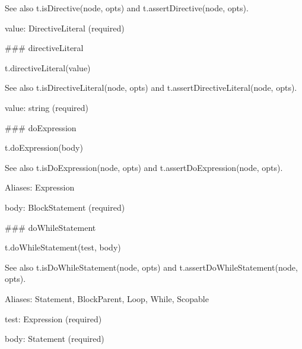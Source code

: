 See also {\ttfamily t.\+is\+Directive(node, opts)} and {\ttfamily t.\+assert\+Directive(node, opts)}.


\begin{DoxyItemize}
\item {\ttfamily value}\+: {\ttfamily Directive\+Literal} (required) 


\end{DoxyItemize}

\#\#\# directive\+Literal 
\begin{DoxyCode}
t.directiveLiteral(value)
\end{DoxyCode}


See also {\ttfamily t.\+is\+Directive\+Literal(node, opts)} and {\ttfamily t.\+assert\+Directive\+Literal(node, opts)}.


\begin{DoxyItemize}
\item {\ttfamily value}\+: {\ttfamily string} (required) 


\end{DoxyItemize}

\#\#\# do\+Expression 
\begin{DoxyCode}
t.doExpression(body)
\end{DoxyCode}


See also {\ttfamily t.\+is\+Do\+Expression(node, opts)} and {\ttfamily t.\+assert\+Do\+Expression(node, opts)}.

Aliases\+: {\ttfamily Expression}


\begin{DoxyItemize}
\item {\ttfamily body}\+: {\ttfamily Block\+Statement} (required) 


\end{DoxyItemize}

\#\#\# do\+While\+Statement 
\begin{DoxyCode}
t.doWhileStatement(test, body)
\end{DoxyCode}


See also {\ttfamily t.\+is\+Do\+While\+Statement(node, opts)} and {\ttfamily t.\+assert\+Do\+While\+Statement(node, opts)}.

Aliases\+: {\ttfamily Statement}, {\ttfamily Block\+Parent}, {\ttfamily Loop}, {\ttfamily While}, {\ttfamily Scopable}


\begin{DoxyItemize}
\item {\ttfamily test}\+: {\ttfamily Expression} (required)
\item {\ttfamily body}\+: {\ttfamily Statement} (required) 


\end{DoxyItemize}

